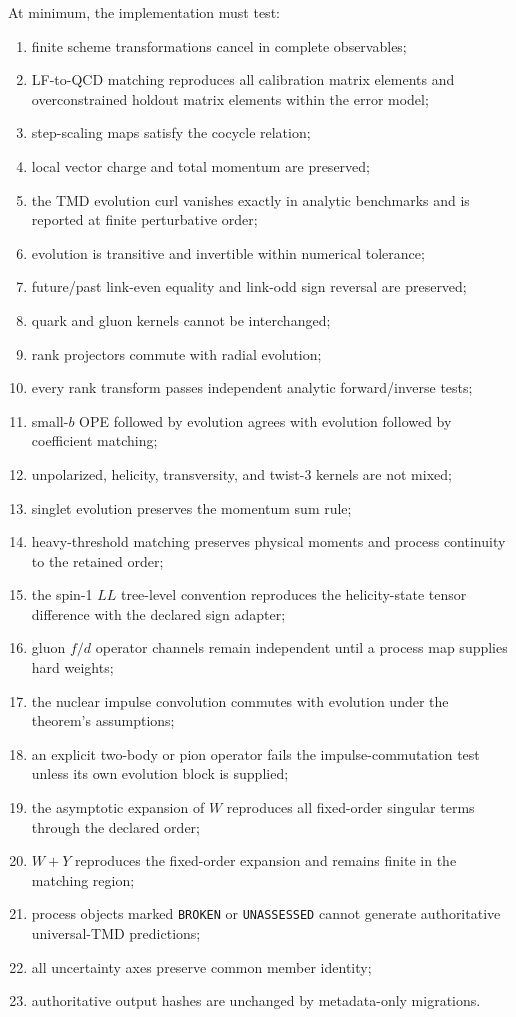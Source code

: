 \documentclass[11pt]{article}
\begin{document}
At minimum, the implementation must test:
\begin{enumerate}
\item finite scheme transformations cancel in complete observables;
\item LF-to-QCD matching reproduces all calibration matrix elements and
      overconstrained holdout matrix elements within the error model;
\item step-scaling maps satisfy the cocycle relation;
\item local vector charge and total momentum are preserved;
\item the TMD evolution curl vanishes exactly in analytic benchmarks and is
      reported at finite perturbative order;
\item evolution is transitive and invertible within numerical tolerance;
\item future/past link-even equality and link-odd sign reversal are preserved;
\item quark and gluon kernels cannot be interchanged;
\item rank projectors commute with radial evolution;
\item every rank transform passes independent analytic forward/inverse tests;
\item small-\(b\) OPE followed by evolution agrees with evolution followed by
      coefficient matching;
\item unpolarized, helicity, transversity, and twist-3 kernels are not mixed;
\item singlet evolution preserves the momentum sum rule;
\item heavy-threshold matching preserves physical moments and process
      continuity to the retained order;
\item the spin-1 \(LL\) tree-level convention reproduces the helicity-state
      tensor difference with the declared sign adapter;
\item gluon \(f/d\) operator channels remain independent until a process map
      supplies hard weights;
\item the nuclear impulse convolution commutes with evolution under the
      theorem's assumptions;
\item an explicit two-body or pion operator fails the impulse-commutation test
      unless its own evolution block is supplied;
\item the asymptotic expansion of \(W\) reproduces all fixed-order singular
      terms through the declared order;
\item \(W+Y\) reproduces the fixed-order expansion and remains finite in the
      matching region;
\item process objects marked \texttt{BROKEN} or \texttt{UNASSESSED} cannot
      generate authoritative universal-TMD predictions;
\item all uncertainty axes preserve common member identity;
\item authoritative output hashes are unchanged by metadata-only migrations.
\end{enumerate}
\end{document}
